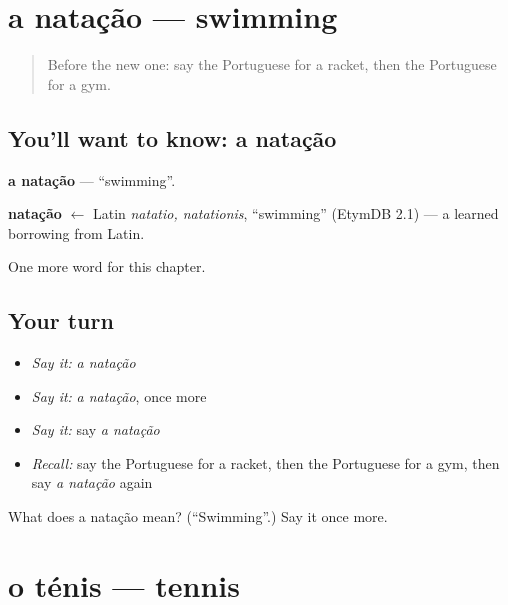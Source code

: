 \section[a natação]{a natação — swimming}

\label{lesson:PT-C226-natacao}



\begin{quote}
Before the new one: say the Portuguese for a racket, then the Portuguese for a gym.
\end{quote}

\subsection*{You'll want to know: a natação}
\textbf{a natação} — \textquotedblleft{}swimming\textquotedblright{}.

\begin{cousinweb}
\textbf{natação} $\leftarrow$ Latin \emph{natatio, natationis}, \textquotedblleft{}swimming\textquotedblright{} (EtymDB 2.1) — a learned borrowing from Latin.
\end{cousinweb}

\begin{grammarlens}[title={What you've built}]
One more word for this chapter.
\end{grammarlens}

\subsection*{Your turn}
\begin{itemize}
\raggedright
  \item \emph{Say it:} \emph{a natação}
  \item \emph{Say it:} \emph{a natação}, once more
  \item \emph{Say it:} say \emph{a natação}
  \item \emph{Recall:} say the Portuguese for a racket, then the Portuguese for a gym, then say \emph{a natação} again
\end{itemize}

\begin{tcolorbox}[breakable,colback=teal!4,colframe=teal!35!black,title={Before you move on}]
What does a natação mean? (\textquotedblleft{}Swimming\textquotedblright{}.) Say it once more.
\end{tcolorbox}
\section[o ténis]{o ténis — tennis}

